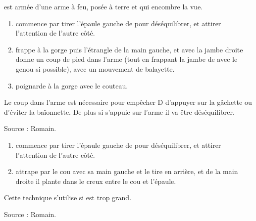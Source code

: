 \begin{technique}

\D est armée d'une arme à feu, posée à terre et qui encombre la vue.

\begin{enumerate}
	\item \A commence par tirer l'épaule gauche de \D pour déséquilibrer, et attirer l'attention de l'autre côté.
	
	\item \A frappe \D à la gorge puis l'étrangle de la main gauche, et avec la jambe droite donne un coup de pied dans l'arme (tout en frappant la jambe de \D avec le genou si possible), avec un mouvement de balayette.
	
	\item \A poignarde \D à la gorge avec le couteau.
\end{enumerate}

Le coup dans l'arme est nécessaire pour empêcher D d'appuyer sur la gâchette ou d'éviter la baïonnette.
De plus si \D s'appuie sur l'arme il va être déséquilibrer.

Source : Romain.
\end{technique}


\begin{technique}

\begin{enumerate}
	\item \A commence par tirer l'épaule gauche de \D pour déséquilibrer, et attirer l'attention de l'autre côté.
	
	\item \A attrape \D par le cou avec sa main gauche et le tire en arrière, et de la main droite il plante dans le creux entre le cou et l'épaule.
\end{enumerate}

Cette technique s'utilise si \D est trop grand.

Source : Romain.
\end{technique}
